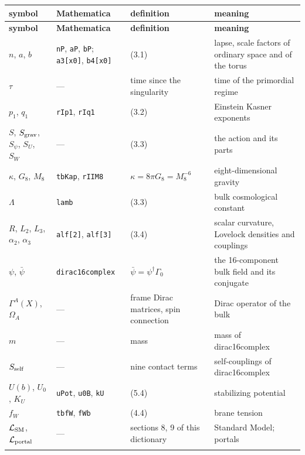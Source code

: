 \documentclass[10pt,a4paper]{article}
\begin{document}
{\footnotesize
\begin{longtable}{>{\raggedright\arraybackslash}p{}>{\raggedright\arraybackslash}p{}>{\raggedright\arraybackslash}p{}>{\raggedright\arraybackslash}p{}}
\toprule
\textbf{symbol} & \textbf{Mathematica} & \textbf{definition} & \textbf{meaning} \\
\midrule\endfirsthead
\toprule
\textbf{symbol} & \textbf{Mathematica} & \textbf{definition} & \textbf{meaning} \\
\midrule\endhead
\endfoot
\bottomrule\endlastfoot
$n$, $a$, $b$ & \texttt{nP}, \texttt{aP}, \texttt{bP}; \texttt{a3[x0]}, \texttt{b4[x0]} & (3.1) & lapse, scale factors of ordinary space and of the torus \\
$\tau$ & — & time since the singularity & time of the primordial regime \\
$p_1$, $q_1$ & \texttt{rIp1}, \texttt{rIq1} & (3.2) & Einstein Kasner exponents \\
$S$, $S_{\rm grav}$, $S_\psi$, $S_U$, $S_W$ & — & (3.3) & the action and its parts \\
$\kappa$, $G_8$, $M_8$ & \texttt{tbKap}, \texttt{rIIM8} & $\kappa=8\pi G_8=M_8^{-6}$ & eight-dimensional gravity \\
$\Lambda$ & \texttt{lamb} & (3.3) & bulk cosmological constant \\
$R$, $L_2$, $L_3$, $\alpha_2$, $\alpha_3$ & \texttt{alf[2]}, \texttt{alf[3]} & (3.4) & scalar curvature, Lovelock densities and couplings \\
$\psi$, $\bar\psi$ & \texttt{dirac16complex} & $\bar\psi=\psi^\dagger\Gamma_0$ & the 16-component bulk field and its conjugate \\
$\Gamma^A(X)$, $\Omega_A$ & — & frame Dirac matrices, spin connection & Dirac operator of the bulk \\
$m$ & — & mass & mass of dirac16complex \\
$S_{\rm self}$ & — & nine contact terms & self-couplings of dirac16complex \\
$U(b)$, $U_0$, $K_U$ & \texttt{uPot}, \texttt{u0B}, \texttt{kU} & (5.4) & stabilizing potential \\
$f_W$ & \texttt{tbfW}, \texttt{fWb} & (4.4) & brane tension \\
$\mathcal L_{\rm SM}$, $\mathcal L_{\rm portal}$ & — & sections 8, 9 of this dictionary & Standard Model; portals \\*
\end{longtable}}
\end{document}
